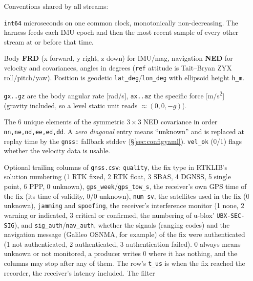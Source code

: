 \documentclass[11pt,a4paper]{article}
\newcommand{\code}[1]{\texttt{#1}}
\begin{document}
\noindent Conventions shared by all streams:
\begin{description}\setlength\itemsep{0pt}
  \item[Timestamp \code{t\_\allowbreak{}us}] \code{int64} microseconds on one common clock,
    monotonically non-decreasing. The harness feeds each IMU epoch and then the
    most recent sample of every other stream at or before that time.
  \item[Frames] Body \textbf{FRD} (x forward, y right, z down) for IMU/mag,
    navigation \textbf{NED} for velocity and covariances, angles in degrees
    (\code{ref} attitude is Tait--Bryan ZYX roll/pitch/yaw). Position is
    geodetic \code{lat\_\allowbreak{}deg}/\code{lon\_\allowbreak{}deg} with ellipsoid height \code{h\_\allowbreak{}m}.
  \item[IMU] \code{gx..gz} are the body angular rate [rad/s], \code{ax..az} the
    specific force [m/s\textsuperscript{2}] (gravity included, so a level static
    unit reads $\approx(0,0,-g)$).
  \item[GNSS covariance] The 6 unique elements of the symmetric $3\times3$ NED
    covariance in order \code{nn,ne,nd,ee,ed,dd}. A \emph{zero diagonal} entry
    means ``unknown'' and is replaced at replay time by the \code{gnss:}
    fallback stddev (\S\ref{sec:configyaml}). \code{vel\_\allowbreak{}ok} (0/1) flags whether
    the velocity data is usable.
  \item[GNSS quality and time] Optional trailing columns of
    \code{gnss.csv}: \code{quality}, the fix type in RTKLIB's solution
    numbering (1 RTK fixed, 2 RTK float, 3 SBAS, 4 DGNSS, 5 single point,
    6 PPP, 0 unknown), \code{gps\_\allowbreak{}week}/\code{gps\_\allowbreak{}tow\_\allowbreak{}s},
    the receiver's own GPS time of the fix (its time of validity, 0/0
    unknown), \code{num\_\allowbreak{}sv}, the satellites used in the fix
    (0 unknown), \code{jamming} and \code{spoofing}, the receiver's
    interference monitor (1 none, 2 warning or indicated, 3 critical or
    confirmed, the numbering of u-blox' \code{UBX-SEC-SIG}), and
    \code{sig\_\allowbreak{}auth}/\code{nav\_\allowbreak{}auth}, whether
    the signals (ranging codes) and the navigation message (Galileo OSNMA,
    for example) of the fix were authenticated (1 not authenticated,
    2 authenticated, 3 authentication failed). 0 always means unknown or
    not monitored, a producer writes 0 where it has nothing, and the
    columns may stop after any of them. The row's \code{t\_us} is when the
    fix reached the recorder, the receiver's latency included. The filter

\end{description}
\end{document}
